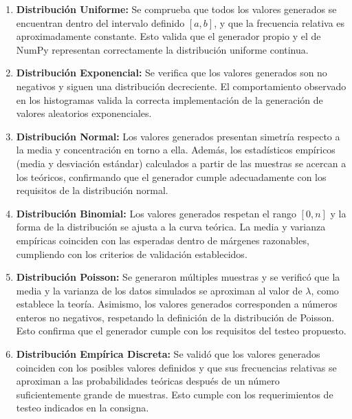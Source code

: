 \documentclass{article}
\begin{document}
\begin{enumerate}
    \item \textbf{Distribución Uniforme:} Se comprueba que todos los valores generados se encuentran dentro del intervalo definido $[a, b]$, y que la frecuencia relativa es aproximadamente constante. Esto valida que el generador propio y el de NumPy representan correctamente la distribución uniforme continua.
 
    \item \textbf{Distribución Exponencial:} Se verifica que los valores generados son no negativos y siguen una distribución decreciente. El comportamiento observado en los histogramas valida la correcta implementación de la generación de valores aleatorios exponenciales.
 
    \item \textbf{Distribución Normal:} Los valores generados presentan simetría respecto a la media y concentración en torno a ella. Además, los estadísticos empíricos (media y desviación estándar) calculados a partir de las muestras se acercan a los teóricos, confirmando que el generador cumple adecuadamente con los requisitos de la distribución normal.
 
    \item \textbf{Distribución Binomial:} Los valores generados respetan el rango $[0, n]$ y la forma de la distribución se ajusta a la curva teórica. La media y varianza empíricas coinciden con las esperadas dentro de márgenes razonables, cumpliendo con los criterios de validación establecidos.
 
    \item \textbf{Distribución Poisson:} Se generaron múltiples muestras y se verificó que la media y la varianza de los datos simulados se aproximan al valor de $\lambda$, como establece la teoría. Asimismo, los valores generados corresponden a números enteros no negativos, respetando la definición de la distribución de Poisson. Esto confirma que el generador cumple con los requisitos del testeo propuesto.
    
    \item \textbf{Distribución Empírica Discreta:} Se validó que los valores generados coinciden con los posibles valores definidos y que sus frecuencias relativas se aproximan a las probabilidades teóricas después de un número suficientemente grande de muestras. Esto cumple con los requerimientos de testeo indicados en la consigna.
    
\end{enumerate}
\end{document}
